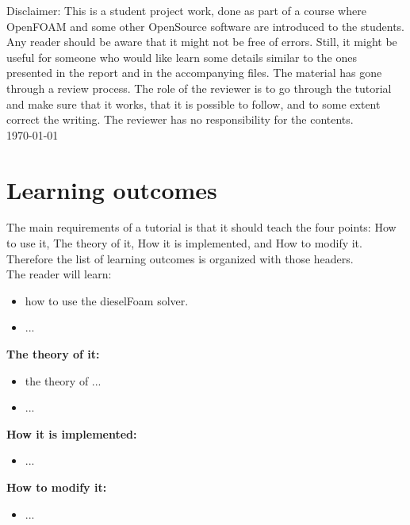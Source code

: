 \documentclass{report}
\begin{document}
\begin{titlepage}
\begin{center}
	\vfill

        {Disclaimer: This is a student project work, done as part of a course where OpenFOAM and some other OpenSource software are introduced to the students. Any reader should be aware that it might not be free of errors. Still, it might be useful for someone who would like learn some details similar to the ones presented in the report and in the accompanying files. The material has gone through a review process. The role of the reviewer is to go through the tutorial and make sure that it works, that it is possible to follow, and to some extent correct the writing. The reviewer has no responsibility for the contents.}\\[2cm]

	{\large \today}
	 
	\end{center}

 \end{titlepage}

\chapter*{Learning outcomes}

The main requirements of a tutorial is that it should teach the four points: How to use it, The theory of it, How it is implemented, and How to modify it. Therefore the list of learning outcomes is organized with those headers.\\[0.4cm]

\noindent The reader will learn:\\[0.4cm]

\begin{itemize}
\item how to use the dieselFoam solver.
\item ...
\end{itemize}
{\bf The theory of it:}
\begin{itemize}
\item the theory of ...
\item ...
\end{itemize}
{\bf How it is implemented:}
\begin{itemize}
\item ...
\end{itemize}
{\bf How to modify it:}    
\begin{itemize}
\item ...
\end{itemize}
\end{document}

